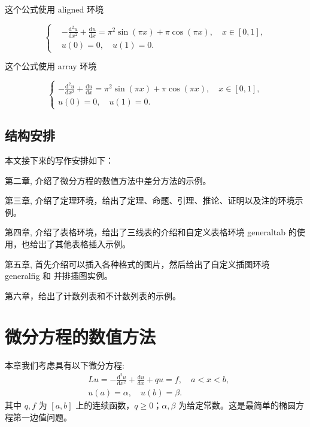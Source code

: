 \documentclass{shnuthesis}
\begin{document}
这个公式使用 aligned 环境

\begin{equation}\label{eq:equation1}
\left\{\begin{aligned}
  &-\frac{\mathrm{d}^{2} u}{\mathrm{d} x^{2}}+\frac{\mathrm{d} u}{\mathrm{d} x}=\pi^{2} \sin (\pi x)+\pi \cos (\pi x),\quad x \in [0,1], \\
  &u(0)=0,\quad u(1)=0.
\end{aligned} \right.
\end{equation}

这个公式使用 array 环境

\begin{equation}\label{eq:equation2}
\left\{\begin{array}{l}
\displaystyle
-\frac{\mathrm{d}^{2} u}{\mathrm{d} x^{2}}+\frac{\mathrm{d} u}{\mathrm{d} x}=\pi^{2} \sin (\pi x)+\pi \cos (\pi x),\quad x \in [0,1], \\[6pt]
u(0)=0,\quad u(1)=0.
\end{array} \right.
\end{equation}
\section{结构安排}

本文接下来的写作安排如下：

第二章,  介绍了微分方程的数值方法中差分方法的示例。

第三章, 介绍了定理环境，给出了定理、命题、引理、推论、证明以及注的环境示例。

第四章, 介绍了表格环境，给出了三线表的介绍和自定义表格环境 generaltab 的使用，也给出了其他表格插入示例。

第五章, 首先介绍可以插入各种格式的图片，然后给出了自定义插图环境 generalfig 和 并排插图实例。

第六章，给出了计数列表和不计数列表的示例。



\chapter{微分方程的数值方法}

本章我们考虑具有以下微分方程:
\begin{equation}\label{Equ11}
\begin{aligned}
& L u=-\frac{\mathrm{d}^{2} u}{\mathrm{d} x^{2}}+\frac{\mathrm{d} u}{\mathrm{d} x}+q u=f, \quad a < x < b, \\
&u(a)=\alpha, \quad u(b)=\beta.
\end{aligned}
\end{equation}
其中 $q, f$ 为 $[a,b]$ 上的连续函数，$q \geqslant 0$；$\alpha, \beta$ 为给定常数。这是最简单的椭圆方程第一边值问题。
\end{document}
